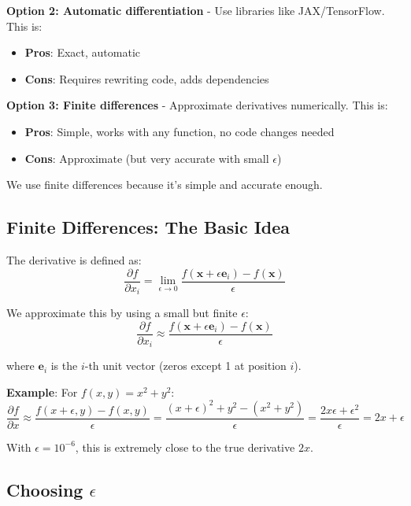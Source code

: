 \documentclass[11pt,a4paper]{article}
\begin{document}
\textbf{Option 2: Automatic differentiation} - Use libraries like JAX/TensorFlow. This is:
\begin{itemize}
    \item \textbf{Pros}: Exact, automatic
    \item \textbf{Cons}: Requires rewriting code, adds dependencies
\end{itemize}

\textbf{Option 3: Finite differences} - Approximate derivatives numerically. This is:
\begin{itemize}
    \item \textbf{Pros}: Simple, works with any function, no code changes needed
    \item \textbf{Cons}: Approximate (but very accurate with small $\epsilon$)
\end{itemize}

We use finite differences because it's simple and accurate enough.

\subsection{Finite Differences: The Basic Idea}

The derivative is defined as:
\begin{equation}
\frac{\partial f}{\partial x_i} = \lim_{\epsilon \to 0} \frac{f(\mathbf{x} + \epsilon \mathbf{e}_i) - f(\mathbf{x})}{\epsilon}
\end{equation}

We approximate this by using a small but finite $\epsilon$:
\begin{equation}
\frac{\partial f}{\partial x_i} \approx \frac{f(\mathbf{x} + \epsilon \mathbf{e}_i) - f(\mathbf{x})}{\epsilon}
\end{equation}

where $\mathbf{e}_i$ is the $i$-th unit vector (zeros except 1 at position $i$).

\textbf{Example}: For $f(x, y) = x^2 + y^2$:
\begin{equation}
\frac{\partial f}{\partial x} \approx \frac{f(x + \epsilon, y) - f(x, y)}{\epsilon} = \frac{(x+\epsilon)^2 + y^2 - (x^2 + y^2)}{\epsilon} = \frac{2x\epsilon + \epsilon^2}{\epsilon} = 2x + \epsilon
\end{equation}

With $\epsilon = 10^{-6}$, this is extremely close to the true derivative $2x$.

\subsection{Choosing $\epsilon$}
\end{document}
